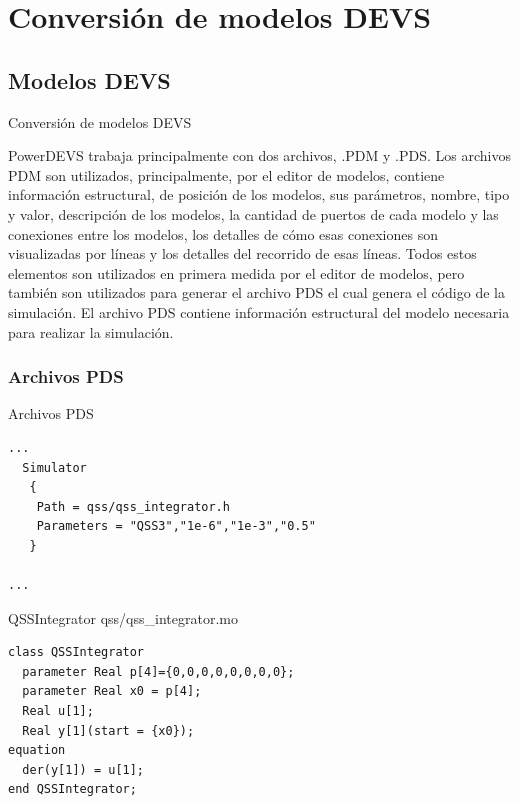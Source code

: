 \documentclass[10pt,presentation]{beamer}
\begin{document}
\section{Conversión de modelos DEVS}
	\subsection{Modelos DEVS}
\begin{frame}{Conversión de modelos DEVS}
\begin{block}{PowerDEVS}
	trabaja principalmente con dos archivos, .PDM y .PDS.
        Los archivos PDM son utilizados, principalmente, por el editor de modelos, contiene información estructural, de posición de los modelos, sus parámetros, nombre, tipo y valor, descripción de los modelos, la cantidad de puertos de cada modelo y las conexiones entre los modelos, los detalles de cómo esas conexiones son visualizadas por líneas y los detalles del recorrido de esas líneas. 
        Todos estos elementos son utilizados en primera medida por el editor de modelos, pero también son utilizados para generar el archivo PDS el cual genera el código de la simulación.
        El archivo PDS contiene información estructural del modelo necesaria para realizar la simulación. 
\end{block}
\end{frame}
		\subsubsection{Archivos PDS}

\begin{frame}[fragile]{Archivos PDS}
\begin{verbatim}
...
  Simulator
   {
    Path = qss/qss_integrator.h
    Parameters = "QSS3","1e-6","1e-3","0.5"
   }
 
...
\end{verbatim}
\end{frame}

\begin{frame}[fragile]{QSSIntegrator}
\centering
    qss/qss\_integrator.mo
\begin{verbatim}
class QSSIntegrator
  parameter Real p[4]={0,0,0,0,0,0,0,0};
  parameter Real x0 = p[4];
  Real u[1];
  Real y[1](start = {x0});
equation
  der(y[1]) = u[1];
end QSSIntegrator;
\end{verbatim}
\end{frame}
\end{document}
